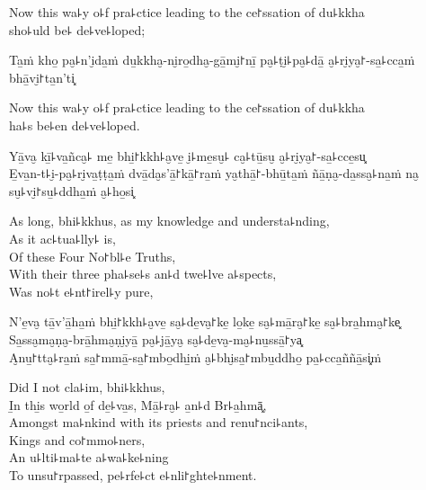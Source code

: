 \begin{english}
  Now this wa꜕y o꜕f pra꜕ctice leading to the ce꜓ssation of du꜕kkha\\
  sho꜕uld be꜕ de꜕ve꜕loped;
\end{english}

Ta̱ṁ kho̱ pa̮꜕n'i̮da̱ṁ du̱kkha̮-ni̮ro̱dha̮-gā̱mi̮꜓nī̱ pa̮꜕ṭi̮꜕pa̮꜕dā̱ a̮꜕ri̮ya̮꜓-sa̱꜕cca̱ṁ bhā̱vi̮꜓ta̱n'ti͓

\begin{english}
  Now this wa꜕y o꜕f pra꜕ctice leading to the ce꜓ssation of du꜕kkha\\
  ha꜕s be꜕en de꜕ve꜕loped.
\end{english}

Yā̱va̮ kī̱꜕va̱ñca̮꜕ me̱ bhi̱꜓kkh꜕a̮ve̱ i̮꜕me̱su̮꜕ ca̮꜕tū̱su̮ a̮꜕ri̮ya̮꜓-sa̱꜕cce̱su͓\\
E̱va̱n-t꜕i̮-pa̮꜕ri̮va̱ṭṭa̱ṁ dvā̱da̮s'ā̱꜓kā̱꜓ra̱ṁ ya̮thā̱꜓-bhū̱ta̱ṁ ñā̱ṇa̮-da̱ssa̮꜕na̱ṁ na̮ su̮꜕vi̮꜓su̱꜕ddha̱ṁ a̮꜕ho̱si͓

\ifaivedition\relax\else
\clearpage
\fi

\begin{english}
  As long, bhi꜕kkhus, as my knowledge and understa꜕nding,\\
  As it ac꜕tua꜕lly꜕ is,\\
  Of these Four No꜓bl꜕e Truths,\\
  With their three pha꜕se꜕s an꜕d twe꜕lve a꜕spects,\\
  Was no꜕t e꜕nt꜓irel꜕y pure,
\end{english}

N'e̱va̮ tā̱v'ā̱ha̱ṁ bhi̱꜓kkh꜕a̮ve̱ sa̮꜕de̱va̮꜓ke̱ lo̱ke̱ sa̮꜕mā̱ra̮꜓ke̱ sa̮꜕bra̱hma̮꜓ke͓\\
Sa̱ssa̮ma̮ṇa̮-brā̱hma̮ṇi̮yā̱ pa̮꜕jā̱ya̮ sa̮꜕de̱va̮-ma̮꜕nu̱ssā̱꜓ya͓\\
A̮nu̱꜓tta̮꜕ra̱ṁ sa̱꜓mmā̱-sa̱꜓mbo̱dhi̱ṁ a̮꜕bhi̮sa̱꜓mbu̱ddho̱ pa̱꜕cca̱ññā̱si͓ṁ

\begin{english}
  Did I not cla꜕im, bhi꜕kkhus,\\
  I̱n thi̱s wo̱rld o̱f de̱꜕va̱s, Mā̱꜕ra̮꜕ a̱n꜕d Br꜕a̱hmā͓,\\
  \ifaivedition
  \clearpage
  \fi
  Amongst ma꜕nkind with its priests and renu꜓nci꜕ants,\\
  Kings and co꜓mmo꜕ners,\\
  An u꜕lti꜕ma꜕te a꜕wa꜕ke꜕ning\\
  To unsu꜓rpassed, pe꜕rfe꜕ct e꜕nli꜓ghte꜕nment.
\end{english}

